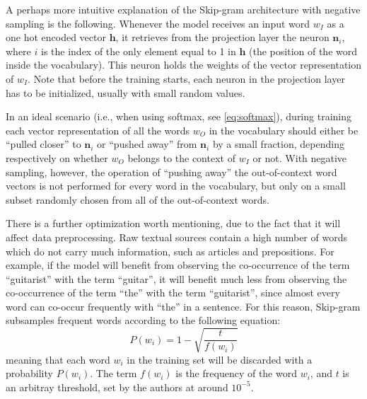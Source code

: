 A perhaps more intuitive explanation of the Skip-gram architecture with negative sampling is the following. Whenever the model receives an input word $w_I$ as a one hot encoded vector $\mathbf{h}$, it retrieves from the projection layer the neuron $\mathbf{n}_i$, where $i$ is the index of the only element equal to 1 in $\mathbf{h}$ (the position of the word inside the vocabulary). This neuron holds the weights of the vector representation of $w_I$. Note that before the training starts, each neuron in the projection layer has to be initialized, usually with small random values.

In an ideal scenario (i.e., when using softmax, see \autoref{eq:softmax}), during training each vector representation of all the words $w_O$ in the vocabulary should either be ``pulled closer'' to $\mathbf{n}_i$ or ``pushed away'' from $\mathbf{n}_i$ by a small fraction, depending respectively on whether $w_O$ belongs to the context of $w_I$ or not. With negative sampling, however, the operation of ``pushing away'' the out-of-context word vectors is not performed for every word in the vocabulary, but only on a small subset randomly chosen from all of the out-of-context words.

There is a further optimization worth mentioning, due to the fact that it will affect data preprocessing. Raw textual sources contain a high number of words which do not carry much information, such as articles and prepositions. For example, if the model will benefit from observing the co-occurrence of the term ``guitarist'' with the term ``guitar'', it will benefit much less from observing the co-occurrence of the term ``the'' with the term ``guitarist'', since almost every word can co-occur frequently with ``the'' in a sentence. For this reason, Skip-gram subsamples frequent words according to the following equation:
\begin{equation}
P(w_i) = 1 - \sqrt{\frac{t}{f(w_i)}}
\end{equation}
meaning that each word $w_i$ in the training set will be discarded with a probability $P(w_i)$. The term $f(w_i)$ is the frequency of the word $w_i$, and $t$ is an arbitray threshold, set by the authors at around $10^{-5}$.


